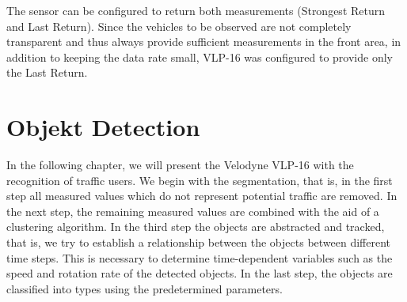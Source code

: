 \documentclass[11pt,oneside,openright]{mpreport}
\begin{document}

The sensor can be configured to return both measurements (Strongest Return and Last Return). Since the vehicles to be observed are not completely transparent and thus 
always provide sufficient measurements in the front area, in addition to keeping the data rate small, VLP-16 was configured to provide only the Last Return.



\chapter{Objekt Detection}

In the following chapter, we will present the Velodyne VLP-16 with the recognition of traffic users. We begin with the segmentation,
that is, in the first step all measured values which do not represent potential traffic are removed. 
In the next step, the remaining measured values are combined with the aid of a clustering algorithm. 
In the third step the objects are abstracted and tracked, that is, we try to establish a relationship between the objects between different time steps.
This is necessary to determine time-dependent variables such as the speed and rotation rate of the detected objects.
In the last step, the objects are classified into types using the predetermined parameters.
\end{document}
